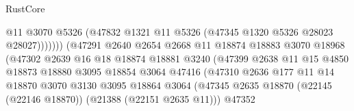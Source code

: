 \begin{lexlean}{RustCore}
\begin{coremodule}
                                              @11
                                              @3070
                                              @5326
                                              (@47832
                                                @1321
                                                @11
                                                @5326
                                                (@47345 @1320 @5326 @28023 @28027)))))))
                                    (@47291
                                      @2640
                                      @2654
                                      @2668
                                      @11
                                      @18874
                                      @18883
                                      @3070
                                      @18968
                                      (@47302
                                        @2639
                                        @16
                                        @18
                                        @18874
                                        @18881
                                        @3240
                                        (@47399
                                          @2638
                                          @11
                                          @15
                                          @4850
                                          @18873
                                          @18880
                                          @3095
                                          @18854
                                          @3064
                                          @47416
                                          (@47310
                                            @2636
                                            @177
                                            @11
                                            @14
                                            @18870
                                            @3070
                                            @3130
                                            @3095
                                            @18864
                                            @3064
                                            (@47345
                                              @2635
                                              @18870
                                              (@22145 (@22146 @18870))
                                              (@21388 (@22151 @2635 @11)))
                                            @47352

\end{coremodule}
\end{lexlean}
